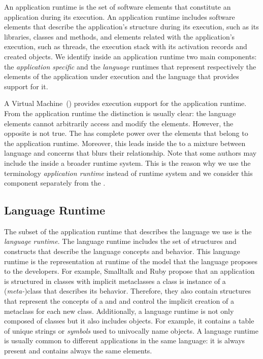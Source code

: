 An application runtime is the set of software elements that constitute an application during its execution. An application runtime includes software elements that describe the application's structure during its execution, such as its libraries, classes and methods, and elements related with the application's execution, such as threads, the execution stack with its activation records and created objects. We identify inside an application runtime two main components: the \emph{application specific} and the \emph{language} runtimes that represent respectively the elements of the application under execution and the language that provides support for it.

A Virtual Machine~(\VM) provides execution support for the application runtime. From the application runtime the distinction is usually clear: the language elements cannot arbitrarily access and modify the \VM elements. However, the opposite is not true. The \VM has complete power over the elements that belong to the application runtime. Moreover, this leads inside the \VM to a mixture between language and \VM concerns that blurs their relationship.
Note that some authors may include the \VM inside a broader runtime system.
This is the reason why we use the terminology \emph{application runtime} instead of runtime system and we consider this component separately from the \VM.

\subsection{Language Runtime}

The subset of the application runtime that describes the language we use is the \emph{language runtime}. The language runtime includes the set of structures and constructs that describe the language concepts and behavior. This language runtime is the representation at runtime of the model that the language proposes to the developers. For example, Smalltalk and Ruby propose that an application is structured in classes with implicit metaclasses \ie a class is instance of a (\emph{meta-})class that describes its behavior. Therefore, they also contain structures that represent the concepts of a  and  and control the implicit creation of a metaclass for each new class. Additionally, a language runtime is not only composed of classes but it also includes objects. For example, it contains a table of unique strings or \emph{symbols} used to univocally name objects. A language runtime is usually common to different applications in the same language: it is always present and contains always the same elements.

